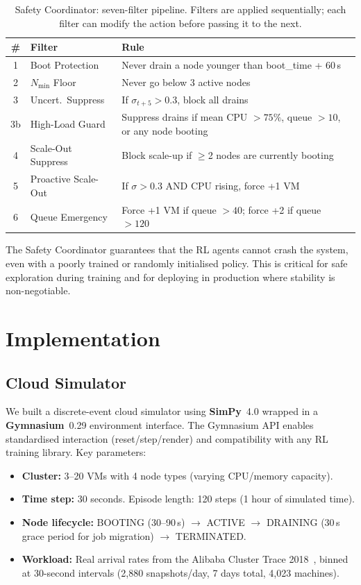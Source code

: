 \documentclass[conference]{IEEEtran}
\begin{document}
\begin{table}[h]
\centering
\caption{Safety Coordinator: seven-filter pipeline.  Filters are applied
sequentially; each filter can modify the action before passing it to the next.}
\label{tab:safety}
\begin{tabular}{clp{4cm}}
\toprule
\textbf{\#} & \textbf{Filter} & \textbf{Rule} \\
\midrule
1 & Boot Protection & Never drain a node younger than boot\_time + 60\,s \\
2 & $N_{\min}$ Floor & Never go below 3 active nodes \\
3 & Uncert.\ Suppress & If $\sigma_{t+5} > 0.3$, block all drains \\
3b & High-Load Guard & Suppress drains if mean CPU $> 75\%$, queue $> 10$, or any node booting \\
4 & Scale-Out Suppress & Block scale-up if $\geq$2 nodes are currently booting \\
5 & Proactive Scale-Out & If $\sigma > 0.3$ AND CPU rising, force +1 VM \\
6 & Queue Emergency & Force +1 VM if queue $> 40$; force +2 if queue $> 120$ \\
\bottomrule
\end{tabular}
\end{table}

The Safety Coordinator guarantees that the RL agents cannot crash the system,
even with a poorly trained or randomly initialised policy.  This is critical
for safe exploration during training and for deploying in production where
stability is non-negotiable.

\section{Implementation}

\subsection{Cloud Simulator}

We built a discrete-event cloud simulator using \textbf{SimPy}~4.0 wrapped in a
\textbf{Gymnasium}~0.29 environment interface.  The Gymnasium API enables
standardised interaction (reset/step/render) and compatibility with any RL
training library.  Key parameters:
\begin{itemize}[leftmargin=*]
  \item \textbf{Cluster:} 3--20 VMs with 4 node types (varying CPU/memory
        capacity).
  \item \textbf{Time step:} 30 seconds. Episode length: 120 steps (1 hour of
        simulated time).
  \item \textbf{Node lifecycle:} BOOTING (30--90\,s) $\rightarrow$ ACTIVE
        $\rightarrow$ DRAINING (30\,s grace period for job migration)
        $\rightarrow$ TERMINATED.
  \item \textbf{Workload:} Real arrival rates from the Alibaba Cluster Trace
        2018~\cite{alibaba2018}, binned at 30-second intervals (2,880
        snapshots/day, 7 days total, 4,023 machines).
\end{itemize}
\end{document}
